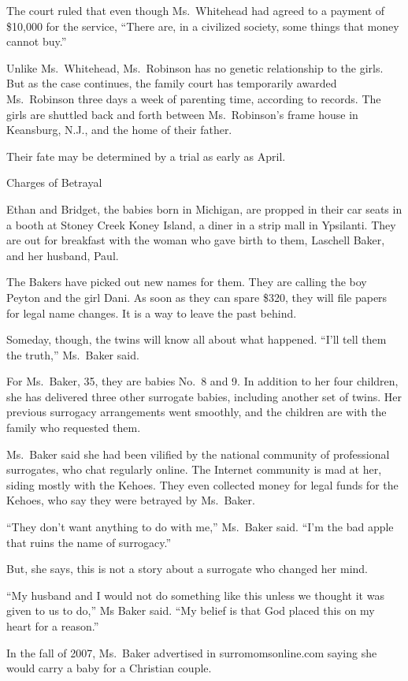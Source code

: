 ﻿\documentclass[12pt]{article}
\begin{document}
The court ruled that even though Ms.~Whitehead had agreed to a payment of \$10,000 for the service,
``There are, in a civilized society, some things that money cannot buy.''

Unlike Ms.~Whitehead, Ms.~Robinson has no genetic relationship to the girls. But as the case
continues, the family court has temporarily awarded Ms.~Robinson three days a week of parenting
time, according to records. The girls are shuttled back and forth between Ms.~Robinson's frame house
in Keansburg, N.J., and the home of their father.

Their fate may be determined by a trial as early as April.

Charges of Betrayal

Ethan and Bridget, the babies born in Michigan, are propped in their car seats in a booth at Stoney
Creek Koney Island, a diner in a strip mall in Ypsilanti. They are out for breakfast with the woman
who gave birth to them, Laschell Baker, and her husband, Paul.

The Bakers have picked out new names for them. They are calling the boy Peyton and the girl Dani. As
soon as they can spare \$320, they will file papers for legal name changes. It is a way to leave the
past behind.

Someday, though, the twins will know all about what happened. ``I'll tell them the truth,''
Ms.~Baker said.

For Ms.~Baker, 35, they are babies No.~8 and 9. In addition to her four children, she has delivered
three other surrogate babies, including another set of twins. Her previous surrogacy arrangements
went smoothly, and the children are with the family who requested them.

Ms.~Baker said she had been vilified by the national community of professional surrogates, who chat
regularly online. The Internet community is mad at her, siding mostly with the Kehoes. They even
collected money for legal funds for the Kehoes, who say they were betrayed by Ms.~Baker.

``They don't want anything to do with me,'' Ms.~Baker said. ``I'm the bad apple that ruins the name
of surrogacy.''

But, she says, this is not a story about a surrogate who changed her mind.

``My husband and I would not do something like this unless we thought it was given to us to do,'' Ms
Baker said. ``My belief is that God placed this on my heart for a reason.''

In the fall of 2007, Ms.~Baker advertised in surromomsonline.com saying she would carry a baby for a
Christian couple.
\end{document}
